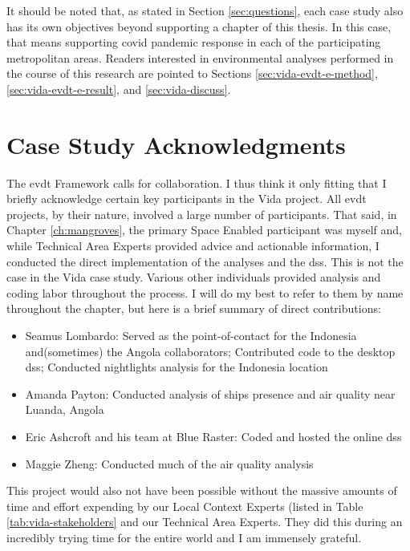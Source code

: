 It should be noted that, as stated in Section \ref{sec:questions}, each case study also has its own objectives beyond supporting a chapter of this thesis. In this case, that means supporting \ac{covid} pandemic response in each of the participating metropolitan areas. Readers interested in environmental analyses performed in the course of this research are pointed to Sections \ref{sec:vida-evdt-e-method}, \ref{sec:vida-evdt-e-result}, and \ref{sec:vida-discuss}.

\section{Case Study Acknowledgments}

The \ac{evdt} Framework calls for collaboration. I thus think it only fitting that I briefly acknowledge certain key participants in the Vida project. All \ac{evdt} projects, by their nature, involved a large number of participants. That said, in Chapter \ref{ch:mangroves}, the primary Space Enabled participant was myself and, while Technical Area Experts provided advice and actionable information, I conducted the direct implementation of the analyses and the \ac{dss}. This is not the case in the Vida case study. Various other individuals provided analysis and coding labor throughout the process. I will do my best to refer to them by name throughout the chapter, but here is a brief summary of direct contributions:

\begin{itemize}[itemsep=0pt,parsep=0pt]
	\item{Seamus Lombardo: Served as the point-of-contact for the Indonesia and(sometimes) the Angola collaborators; Contributed code to the desktop \ac{dss}; Conducted nightlights analysis for the Indonesia location}
	\item{Amanda Payton: Conducted analysis of ships presence and air quality near Luanda, Angola}
	\item{Eric Ashcroft and his team at Blue Raster: Coded and hosted the online \ac{dss}}
	\item{Maggie Zheng: Conducted much of the air quality analysis}
\end{itemize}

This project would also not have been possible without the massive amounts of time and effort expending by our Local Context Experts (listed in Table \ref{tab:vida-stakeholders} and our Technical Area Experts. They did this during an incredibly trying time for the entire world and I am immensely grateful.


